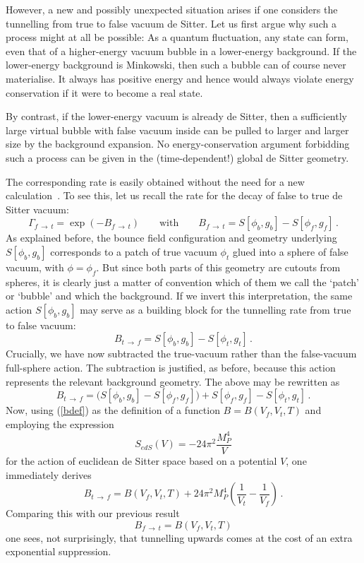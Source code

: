 \documentclass[12pt]{article}
\newcommand{\be}{\begin{equation}}
\newcommand{\ee}{\end{equation}}
\numberwithin{equation}{section}
\begin{document}
However, a new and possibly unexpected situation arises if one considers the tunnelling from true to false vacuum de Sitter. Let us first argue why such a process might at all be possible: As a quantum fluctuation, any state can form, even that of a higher-energy vacuum bubble in a lower-energy background. If the lower-energy background is Minkowski, then such a bubble can of course never materialise. It always has positive energy and hence would always violate energy conservation if it were to become a real state. 

By contrast, if the lower-energy vacuum is already de Sitter, then a sufficiently large virtual bubble with false vacuum inside can be pulled to larger and larger size by the background expansion. No energy-conservation argument forbidding such a process can be given in the (time-dependent!) global de Sitter geometry.

The corresponding rate is easily obtained without the need for a new calculation~\cite{Lee:1987qc, SchwartzPerlov:2006hi}. To see this, let us recall the rate for the decay of false to true de Sitter vacuum:
\be
\Gamma_{f\,\to\, t}=\exp(-B_{f\,\to\,t})\qquad
\mbox{with}\qquad B_{f\,\to\,t}=S[\phi_b,g_b]-S[\phi_f,g_f]\,.
\ee
As explained before, the bounce field configuration and geometry underlying $S[\phi_b,g_b]$ corresponds to a patch of true vacuum $\phi_t$ glued into a sphere of false vacuum, with $\phi=\phi_f$. But since both parts of this geometry are cutouts from spheres, it is clearly just a matter of convention which of them we call the `patch' or `bubble' and which the background. If we invert this interpretation, the same action $S[\phi_b,g_b]$ may serve as a building block for the tunnelling rate from true to false vacuum:
\be
B_{t\,\to\,f}=S[\phi_b,g_b]-S[\phi_t,g_t]\,.
\ee
Crucially, we have now subtracted the true-vacuum rather than the false-vacuum full-sphere action. The subtraction is justified, as before, because this action represents the relevant background geometry. The above may be rewritten as 
\be
B_{t\,\to\,f}=\Big(S[\phi_b,g_b]-S[\phi_f,g_f]\Big)+S[\phi_f,g_f]-S[\phi_t,g_t]
\,.
\ee
Now, using (\ref{bdef}) as the definition of a function $B=B(V_f,V_t,T)$ and employing the expression
\be
S_{edS}(V)=-24\pi^2\frac{M_P^4}{V}
\ee
for the action of euclidean de Sitter space based on a potential $V$, one immediately derives
\be
B_{t\,\to\,f}=B(V_f,V_t,T)+24\pi^2 M_P^4\left(\frac{1}{V_t}-\frac{1}{V_f}\right)\,.
\ee
Comparing this with our previous result
\be
B_{f\,\to\,t}=B(V_f,V_t,T)
\ee
one sees, not surprisingly, that tunnelling upwards comes at the cost of an extra exponential suppression.
\end{document}
